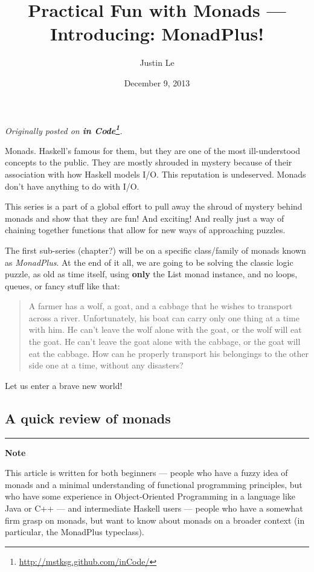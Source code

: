 \documentclass[]{article}
\title{Practical Fun with Monads --- Introducing: MonadPlus!}
\author{Justin Le}
\date{December 9, 2013}
\renewcommand{\href}[2]{#2\footnote{\url{#1}}}
\begin{document}
\maketitle

\emph{Originally posted on
\textbf{\href{http://mstksg.github.com/inCode/}{in Code}}.}

Monads. Haskell's famous for them, but they are one of the most
ill-understood concepts to the public. They are mostly shrouded in
mystery because of their association with how Haskell models I/O. This
reputation is undeserved. Monads don't have anything to do with I/O.

This series is a part of a global effort to pull away the shroud of
mystery behind monads and show that they are fun! And exciting! And
really just a way of chaining together functions that allow for new ways
of approaching puzzles.

The first sub-series (chapter?) will be on a specific class/family of
monads known as \emph{MonadPlus}. At the end of it all, we are going to
be solving the classic logic puzzle, as old as time itself, using
\textbf{only} the List monad instance, and no loops, queues, or fancy
stuff like that:

\begin{quote}
A farmer has a wolf, a goat, and a cabbage that he wishes to transport
across a river. Unfortunately, his boat can carry only one thing at a
time with him. He can't leave the wolf alone with the goat, or the wolf
will eat the goat. He can't leave the goat alone with the cabbage, or
the goat will eat the cabbage. How can he properly transport his
belongings to the other side one at a time, without any disasters?
\end{quote}

Let us enter a brave new world!

\subsection{A quick review of monads}\label{a-quick-review-of-monads}

\begin{center}\rule{0.5\linewidth}{\linethickness}\end{center}

\textbf{Note}

This article is written for both beginners --- people who have a fuzzy
idea of monads and a minimal understanding of functional programming
principles, but who have some experience in Object-Oriented Programming
in a language like Java or C++ --- and intermediate Haskell users ---
people who have a somewhat firm grasp on monads, but want to know about
monads on a broader context (in particular, the MonadPlus typeclass).
\end{document}
